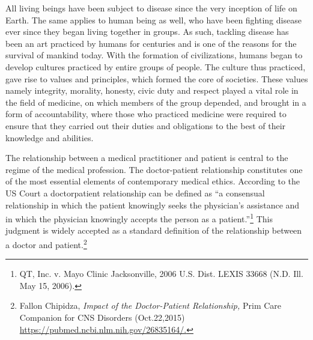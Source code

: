 \setcounter{figure}{0}
\setcounter{table}{0}
\setcounter{footnote}{0}

\label{2016-art6}

\vspace{-.5cm}




\begin{multicols}{2}


\noi
All living beings have been subject to disease since the very inception of life on Earth.
The same applies to human being as well, who have been fighting disease ever since
they began living together in groups. As such, tackling disease has been an art practiced
by humans for centuries and is one of the reasons for the survival of mankind today.
With the formation of civilizations, humans began to develop cultures practiced by
entire groups of people. The culture thus practiced, gave rise to values and principles,
which formed the core of societies. These values namely integrity, morality, honesty,
civic duty and respect played a vital role in the field of medicine, on which members of
the group depended, and brought in a form of accountability, where those who practiced
medicine were required to ensure that they carried out their duties and obligations to the
best of their knowledge and abilities.


\noi
The relationship between a medical practitioner and patient is central to the regime of
the medical profession. The doctor-patient relationship constitutes one of the most
essential elements of contemporary medical ethics. According to the US Court a doctorpatient relationship can be defined as “a consensual relationship in which the patient
knowingly seeks the physician’s assistance and in which the physician knowingly
accepts the person as a patient.”\footnote{ QT, Inc. v. Mayo Clinic Jacksonville, 2006 U.S. Dist. LEXIS 33668 (N.D. Ill. May 15, 2006).} This judgment is widely accepted as a standard definition of the relationship between a doctor and patient.\footnote{Fallon Chipidza, \textit{Impact of the Doctor-Patient Relationship,} Prim Care Companion for CNS Disorders (Oct.22,2015) \url{https://pubmed.ncbi.nlm.nih.gov/26835164/.}}


\end{multicols}
